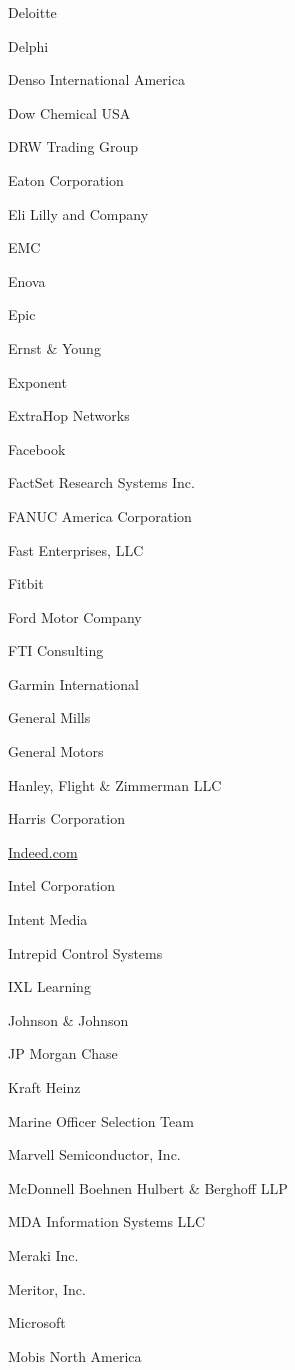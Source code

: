 \documentclass[twoside]{article}
\begin{document}
\begin{center}
\begin{multicols}{5}
\begin{FlushLeft}
\begin{compactitem}
\item Deloitte
\item Delphi
\item Denso International America
\item Dow Chemical USA
\item DRW Trading Group
\item Eaton Corporation
\item Eli Lilly and Company
\item EMC
\item Enova
\item Epic
\item Ernst \& Young
\item Exponent
\item ExtraHop Networks
\item Facebook
\item FactSet Research Systems Inc.
\item FANUC America Corporation
\item Fast Enterprises, LLC
\item Fitbit
\item Ford Motor Company
\item FTI Consulting
\item Garmin International
\item General Mills
\item General Motors
\item Hanley, Flight \& Zimmerman LLC
\item Harris Corporation
\item \url{Indeed.com}
\item Intel Corporation
\item Intent Media
\item Intrepid Control Systems
\item IXL Learning
\item Johnson \& Johnson
\item JP Morgan Chase
\item Kraft Heinz
\item Marine Officer Selection Team
\item Marvell Semiconductor, Inc.
\item McDonnell Boehnen Hulbert \& Berghoff LLP
\item MDA Information Systems LLC
\item Meraki Inc.
\item Meritor, Inc.
\item Microsoft
\item Mobis North America

\end{compactitem}
\end{FlushLeft}
\end{multicols}
\end{center}
\end{document}
